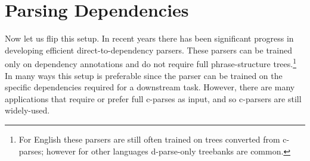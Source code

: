 \documentclass[11pt,letterpaper]{article}
\newcommand{\Left}[1]{#1_{\Leftarrow}}
\newcommand{\Right}[1]{#1_{\Rightarrow}}
\newcommand{\Span}[1]{\langle #1 \rangle}
\begin{document}







\section{Parsing Dependencies}
\label{sec:pardeps}

Now let us flip this setup. In recent years there has been significant
progress in developing efficient direct-to-dependency parsers. These
parsers can be trained only on dependency annotations and do not
require full phrase-structure trees.\footnote{For English these
  parsers are still often trained on trees converted from c-parses;
  however for other languages d-parse-only treebanks are common.}  In
many ways this setup is preferable since the parser can be trained on
the specific dependencies required for a downstream task.  However,
there are many applications that require or prefer full c-parses as input,
and so c-parsers are still widely-used.
\end{document}
